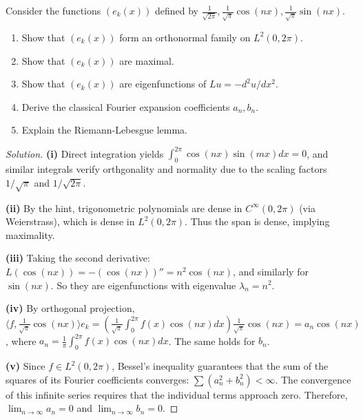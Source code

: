\documentclass{article}
\begin{document}
	\begin{problem}
		Consider the functions $(e_{k}(x))$ defined by $\frac{1}{\sqrt{2\pi}}, \frac{1}{\sqrt{\pi}}\cos(nx), \frac{1}{\sqrt{\pi}}\sin(nx)$.
		\begin{enumerate}
			\item[(i)] Show that $(e_{k}(x))$ form an orthonormal family on $L^{2}(0,2\pi)$.
			\item[(ii)] Show that $(e_{k}(x))$ are maximal.
			\item[(iii)] Show that $(e_{k}(x))$ are eigenfunctions of $Lu = -d^{2}u/dx^{2}$.
			\item[(iv)] Derive the classical Fourier expansion coefficients $a_n, b_n$.
			\item[(v)] Explain the Riemann-Lebesgue lemma.
		\end{enumerate}
	\end{problem}
    \begin{proof}[Solution]
        \textbf{(i)} Direct integration yields $\int_0^{2\pi} \cos(nx)\sin(mx) dx = 0$, and similar integrals verify orthgonality and normality due to the scaling factors $1/\sqrt{\pi}$ and $1/\sqrt{2\pi}$.
        
        \textbf{(ii)} By the hint, trigonometric polynomials are dense in $C^\infty(0, 2\pi)$ (via Weierstrass), which is dense in $L^2(0, 2\pi)$. Thus the span is dense, implying maximality.
        
        \textbf{(iii)} Taking the second derivative: $L(\cos(nx)) = -(\cos(nx))'' = n^2 \cos(nx)$, and similarly for $\sin(nx)$. So they are eigenfunctions with eigenvalue $\lambda_n = n^2$.
        
        \textbf{(iv)} By orthogonal projection, $\langle f, \frac{1}{\sqrt{\pi}}\cos(nx) \rangle e_k = \left( \frac{1}{\sqrt{\pi}} \int_0^{2\pi} f(x)\cos(nx) dx \right) \frac{1}{\sqrt{\pi}}\cos(nx) = a_n \cos(nx)$, where $a_n = \frac{1}{\pi} \int_0^{2\pi} f(x)\cos(nx) dx$. The same holds for $b_n$.
        
        \textbf{(v)} Since $f \in L^2(0, 2\pi)$, Bessel's inequality guarantees that the sum of the squares of its Fourier coefficients converges: $\sum (a_n^2 + b_n^2) < \infty$. The convergence of this infinite series requires that the individual terms approach zero. Therefore, $\lim_{n \to \infty} a_n = 0$ and $\lim_{n \to \infty} b_n = 0$.
    \end{proof}
\end{document}
